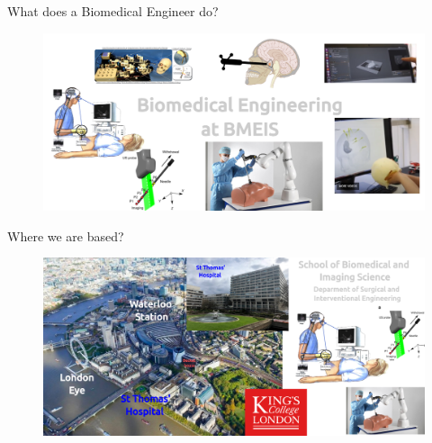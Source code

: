 {
\begin{frame}{}

\BigSizeFont
What does a Biomedical Engineer do?
\end{frame}
}




{
\begin{frame}{}

  \begin{figure}
  \centering
  \includegraphics[width=1.0\textwidth]{./figures/biomedical-engineer/versions/drawing-v00.png}
  \end{figure}

\end{frame}
}




{
\begin{frame}{Where we are based?}

  \begin{figure}
  \centering
  \includegraphics[width=1.0\textwidth]{./figures/where-we-are-based/versions/drawing-v02.png}
  \end{figure}

\end{frame}
}
